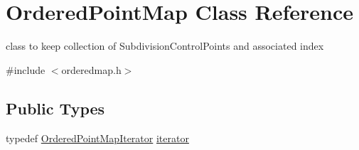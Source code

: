 \hypertarget{classOrderedPointMap}{}\section{Ordered\+Point\+Map Class Reference}
\label{classOrderedPointMap}


class to keep collection of Subdivision\+Control\+Points and associated index  




{\ttfamily \#include $<$orderedmap.\+h$>$}

\subsection*{Public Types}
\begin{DoxyCompactItemize}
\item 
typedef \hyperlink{classOrderedPointMapIterator}{Ordered\+Point\+Map\+Iterator} \hyperlink{classOrderedPointMap_ae58ae7176ea9345af14a8f53bbe57d69}{iterator}
\end{DoxyCompactItemize}
